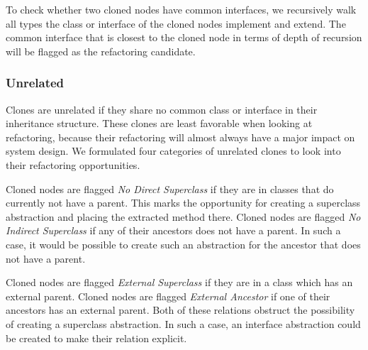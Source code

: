 To check whether two cloned nodes have common interfaces, we recursively walk all types the class or interface of the cloned nodes implement and extend. The common interface that is closest to the cloned node in terms of depth of recursion will be flagged as the refactoring candidate.

\subsubsection{Unrelated}
Clones are unrelated if they share no common class or interface in their inheritance structure. These clones are least favorable when looking at refactoring, because their refactoring will almost always have a major impact on system design. We formulated four categories of unrelated clones to look into their refactoring opportunities.

Cloned nodes are flagged \textit{No Direct Superclass} if they are in classes that do currently not have a parent. This marks the opportunity for creating a superclass abstraction and placing the extracted method there. Cloned nodes are flagged \textit{No Indirect Superclass} if any of their ancestors does not have a parent. In such a case, it would be possible to create such an abstraction for the ancestor that does not have a parent.

Cloned nodes are flagged \textit{External Superclass} if they are in a class which has an external parent. Cloned nodes are flagged \textit{External Ancestor} if one of their ancestors has an external parent. Both of these relations obstruct the possibility of creating a superclass abstraction. In such a case, an interface abstraction could be created to make their relation explicit.

